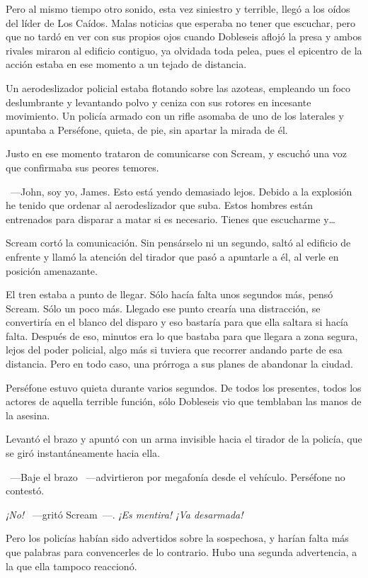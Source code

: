 Pero al mismo tiempo otro sonido, esta vez siniestro y terrible, llegó a los oídos del líder de Los Caídos. Malas noticias que esperaba no tener que escuchar, pero que no tardó en ver con sus propios ojos cuando Dobleseis aflojó la presa y ambos rivales miraron al edificio contiguo, ya olvidada toda pelea, pues el epicentro de la acción estaba en ese momento a un tejado de distancia.

Un aerodeslizador policial estaba flotando sobre las azoteas, empleando un foco deslumbrante y levantando polvo y ceniza con sus rotores en incesante movimiento. Un policía armado con un rifle asomaba de uno de los laterales y apuntaba a Perséfone, quieta, de pie, sin apartar la mirada de él.

Justo en ese momento trataron de comunicarse con Scream, y escuchó una voz que confirmaba sus peores temores.

~---John, soy yo, James. Esto está yendo demasiado lejos. Debido a la explosión he tenido que ordenar al aerodeslizador que suba. Estos hombres están entrenados para disparar a matar si es necesario. Tienes que escucharme y\dots

Scream cortó la comunicación. Sin pensárselo ni un segundo, saltó al edificio de enfrente y llamó la atención del tirador que pasó a apuntarle a él, al verle en posición amenazante.

El tren estaba a punto de llegar. Sólo hacía falta unos segundos más, pensó Scream. Sólo un poco más. Llegado ese punto crearía una distracción, se convertiría en el blanco del disparo y eso bastaría para que ella saltara si hacía falta. Después de eso, minutos era lo que bastaba para que llegara a zona segura, lejos del poder policial, algo más si tuviera que recorrer andando parte de esa distancia. Pero en todo caso, una prórroga a sus planes de abandonar la ciudad.

Perséfone estuvo quieta durante varios segundos. De todos los presentes, todos los actores de aquella terrible función, sólo Dobleseis vio que temblaban las manos de la asesina.

Levantó el brazo y apuntó con un arma invisible hacia el tirador de la policía, que se giró instantáneamente hacia ella.

~---Baje el brazo ~---advirtieron por megafonía desde el vehículo. Perséfone no contestó.

\emph{¡No!} ~---gritó Scream~---. \emph{¡Es mentira! ¡Va desarmada!}

Pero los policías habían sido advertidos sobre la sospechosa, y harían falta más que palabras para convencerles de lo contrario. Hubo una segunda advertencia, a la que ella tampoco reaccionó.

